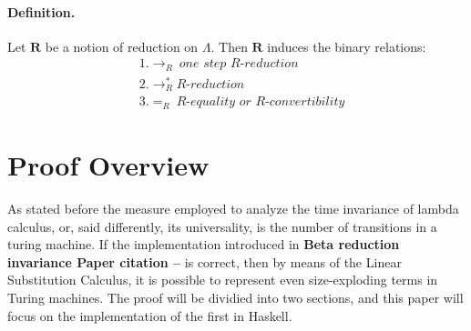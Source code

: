 \documentclass[12pt]{article}
\begin{document}
\paragraph{Definition.} Let $\textbf{R}$ be a notion of reduction on $\Lambda$. Then $\textbf{R}$ induces the binary relations:
\begin{equation}
  \begin{align}
          &1.  \rightarrow_{R} \ \textit{one step R-reduction} \\
          &2. \rightarrow_{R}^{*} \textit{R-reduction} \\
          &3. =_{R} \ \textit{R-equality or R-convertibility}
  \end{align}
\end{equation}

\section{Proof Overview}
As stated before the measure employed to analyze the time invariance of lambda calculus, or, said differently, its universality, is the number of transitions in a turing machine. If the implementation introduced in \textbf{Beta reduction invariance Paper citation --} is correct, then by means of the Linear Substitution Calculus, it is possible to represent even size-exploding terms in Turing machines. The proof will be dividied into two sections, and this paper will focus on the implementation of the first in Haskell.
\end{document}
